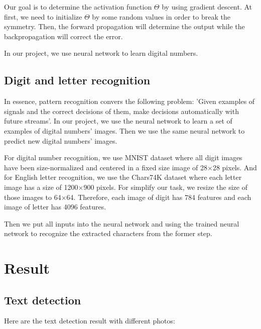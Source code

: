 \documentclass[paper=a4, french, 11pt]{scrartcl}
\begin{document}
Our goal is to determine the activation function $\Theta$ by using gradient descent. At first, we need to initialize $\Theta$ by some random values in order to break the symmetry. Then, the forward propagation will determine the output while the backpropagation will correct the error.

In our project, we use neural network to learn digital numbers.

\subsection{Digit and letter recognition} \mbox{} \vspace{-0.5cm}

In essence, pattern recognition convers the following problem: 'Given examples of signals and the correct decisions of them, make decisions automatically with future streams'. In our project, we use the neural network to learn a set of examples of digital numbers' images. Then we use the same neural network to predict new digital numbers' images. 

For digital number recognition, we use MNIST dataset \cite{lecun1998gradient} where all digit images have been size-normalized and centered in a fixed size image of 28$\times$28 pixels. And for English letter recognition, we use the Chars74K dataset \cite{de2009character} where each letter image has a size of 1200$\times$900 pixels. For simplify our task, we resize the size of those images to 64$\times$64. Therefore, each image of digit has 784 features and each image of letter has 4096 features.

Then we put all inputs into the neural network and using the trained neural network to recognize the extracted characters from the former step.

\section{Result} \mbox{} \vspace{-0.5cm}

\subsection{Text detection} \mbox{} \vspace{-0.5cm}

Here are the text detection result with different photos:
\end{document}
